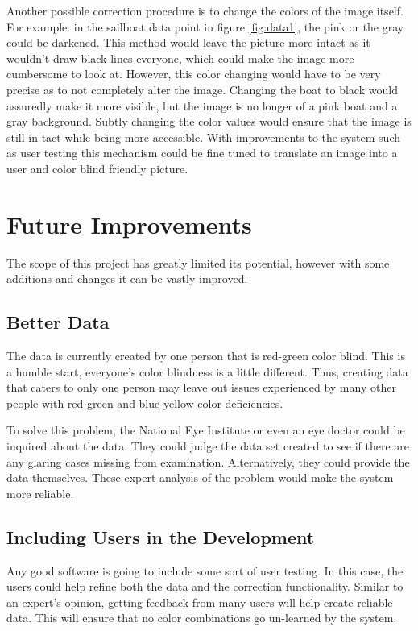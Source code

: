\documentclass[12pt]{article}
\begin{document}
Another possible correction procedure is to change the colors of the image itself. For example. in the sailboat data point in figure \ref{fig:data1}, the pink or the gray could be darkened. This method would leave the picture more intact as it wouldn't draw black lines everyone, which could make the image more cumbersome to look at. However, this color changing would have to be very precise as to not completely alter the image. Changing the boat to black would assuredly make it more visible, but the image is no longer of a pink boat and a gray background. Subtly changing the color values would ensure that the image is still in tact while being more accessible. With improvements to the system such as user testing this mechanism could be fine tuned to translate an image into a user and color blind friendly picture.
\section{Future Improvements}
The scope of this project has greatly limited its potential, however with some additions and changes it can be vastly improved.

\subsection{Better Data}
The data is currently created by one person that is red-green color blind. This is a humble start, everyone's color blindness is a little different. Thus, creating data that caters to only one person may leave out issues experienced by many other people with red-green and blue-yellow color deficiencies.

To solve this problem, the National Eye Institute or even an eye doctor could be inquired about the data. They could judge the data set created to see if there are any glaring cases missing from examination. Alternatively, they could provide the data themselves. These expert analysis of the problem would make the system more reliable.

\subsection{Including Users in the Development}
Any good software is going to include some sort of user testing. In this case, the users could help refine both the data and the correction functionality. Similar to an expert's opinion, getting feedback from many users will help create reliable data. This will ensure that no color combinations go un-learned by the system. 
\end{document}
